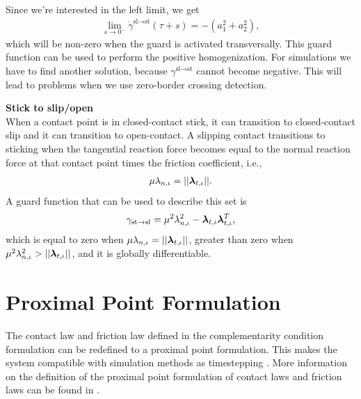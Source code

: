 \documentclass[../DC2019003Bouma.tex]{subfiles}
\begin{document}
Since we're interested in the left limit, we get
\begin{align}
\lim\limits_{s\rightarrow 0^-}\dot{\gamma}^{\text{sl}\rightarrow\text{st}}(\tau+s) = -(a^2_1 + a^2_2),
\end{align}
which will be non-zero when the guard is activated transversally. This guard function can be used to perform the positive homogenization. For simulations we have to find another solution, because $\gamma^{\text{sl}\rightarrow\text{st}}$ cannot become negative. This will lead to problems when we use zero-border crossing detection.

\textbf{Stick to slip/open}\\
When a contact point is in closed-contact stick, it can transition to closed-contact slip and it can transition to open-contact. A slipping contact transitions to sticking when the tangential reaction force becomes equal to the normal reaction force at that contact point times the friction coefficient, i.e.,
\begin{align}
\mu\lambda_{n,\iota} = ||\boldsymbol{\lambda}_{t,\iota}||.
\end{align}
A guard function that can be used to describe this set is
\begin{align}
\gamma_{\text{st}\rightarrow\text{sl}} = \mu^2\lambda^2_{n,\iota} - \boldsymbol{\lambda}_{t,\iota}\boldsymbol{\lambda}_{t,\iota}^T,\label{eq:appguardstsl}
\end{align}
which is equal to zero when $\mu\lambda_{n,\iota} = ||\boldsymbol{\lambda}_{t,\iota}||$, greater than zero when $\mu^2\lambda^2_{n,\iota} > ||\boldsymbol{\lambda}_{t,\iota}||$, and it is globally differentiable. 

\section{Proximal Point Formulation}
The contact law and friction law defined in the complementarity condition formulation can be redefined to a proximal point formulation. This makes the system compatible with simulation methods as timestepping \cite[Chapter 10]{Acary2008}. More information on the definition of the proximal point formulation of contact laws and friction laws can be found in \cite[Section 5.3]{Leine2008}.
\end{document}
